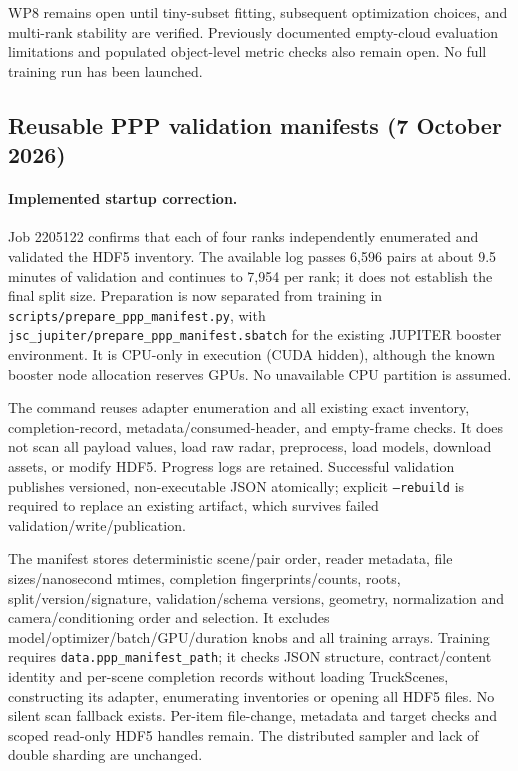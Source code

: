 \documentclass[11pt,a4paper]{article}
\begin{document}
WP8 remains open until tiny-subset fitting, subsequent optimization
choices, and multi-rank stability are verified. Previously documented
empty-cloud evaluation limitations and populated object-level metric
checks also remain open. No full training run has been launched.


\subsection*{Reusable PPP validation manifests (7 October 2026)}

\paragraph{Implemented startup correction.}
Job 2205122 confirms that each of four ranks independently enumerated
and validated the HDF5 inventory. The available log passes 6,596 pairs
at about 9.5 minutes of validation and continues to 7,954 per rank;
it does not establish the final split size. Preparation is now separated
from training in \texttt{scripts/prepare\_ppp\_manifest.py}, with
\texttt{jsc\_jupiter/prepare\_ppp\_manifest.sbatch} for the existing
JUPITER booster environment. It is CPU-only in execution (CUDA hidden),
although the known booster node allocation reserves GPUs. No unavailable
CPU partition is assumed.

The command reuses adapter enumeration and all existing exact inventory,
completion-record, metadata/consumed-header, and empty-frame checks.
It does not scan all payload values, load raw radar, preprocess, load
models, download assets, or modify HDF5. Progress logs are retained.
Successful validation publishes versioned, non-executable JSON
atomically; explicit \texttt{--rebuild} is required to replace an
existing artifact, which survives failed validation/write/publication.

The manifest stores deterministic scene/pair order, reader metadata,
file sizes/nanosecond mtimes, completion fingerprints/counts, roots,
split/version/signature, validation/schema versions, geometry,
normalization and camera/conditioning order and selection. It excludes
model/optimizer/batch/GPU/duration knobs and all training arrays.
Training requires \texttt{data.ppp\_manifest\_path}; it checks JSON
structure, contract/content identity and per-scene completion records
without loading TruckScenes, constructing its adapter, enumerating
inventories or opening all HDF5 files. No silent scan fallback exists.
Per-item file-change, metadata and target checks and scoped read-only
HDF5 handles remain. The distributed sampler and lack of double
sharding are unchanged.
\end{document}
